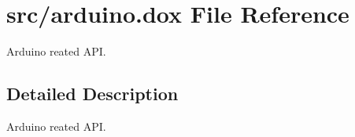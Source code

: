 \hypertarget{arduino_8dox}{}\section{src/arduino.dox File Reference}
\label{arduino_8dox}


Arduino reated A\+PI.  




\subsection{Detailed Description}
Arduino reated A\+PI. 

